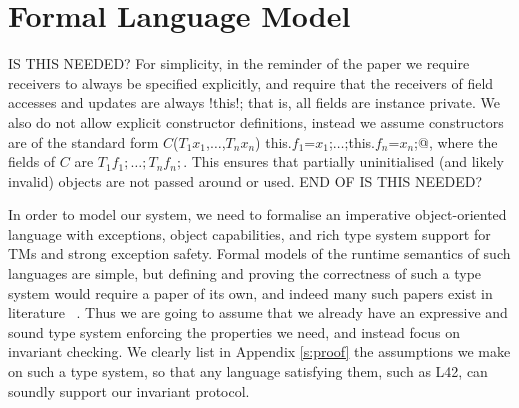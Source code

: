 \section{Formal Language Model}
\label{s:formalism}

IS THIS NEEDED?
For simplicity, in the reminder of the paper we require 
receivers to always be specified explicitly, and require that the receivers of field accesses and updates are always \Q!this!; that is, all fields are instance private.
We also do not allow explicit constructor definitions, instead we assume constructors are of the standard form \Q@$C$($T_1 x_1$,$\ldots$,$T_n x_n$) {this.$f_1$=$x_1$;$\ldots$;this.$f_n$=$x_n$;}@, where the fields of $C$ are $T_1 f_1;\ldots; T_n f_n;$. This ensures that partially uninitialised (and likely invalid) objects are not passed around or used. 
END OF IS THIS NEEDED?

In order to model our system, we need to formalise an imperative object-oriented language
with exceptions, object capabilities, and rich type system
support for TMs and strong exception safety.
Formal models of the runtime semantics of such languages are simple, but 
defining and proving the correctness of such a type system would require a paper
of its own, and indeed many such papers exist in literature%
~\cite{ServettoEtAl13a,ServettoZucca15,GordonEtAl12,clebsch2015deny,JOT:issue_2011_01/article1}.
Thus we are going to assume that we already have an expressive and sound type system enforcing the properties we need, and instead focus on invariant checking.
We clearly list in Appendix \ref{s:proof} the assumptions we make on such a type system, so that any language satisfying them, such as L42, can soundly support our invariant protocol.


